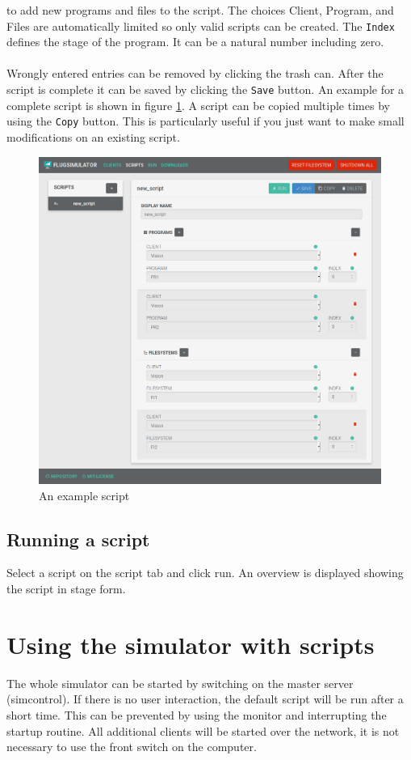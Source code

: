 \documentclass[accentcolor=tud1a, paper=a4, colorback]{tudreport}
\begin{document}
	to add new programs and files to the script. The choices Client, Program, and Files are automatically
	limited so only valid scripts can be created. The \texttt{Index} defines the stage of the
	program. It can be a natural number including zero.
	\\\\
	Wrongly entered entries can be removed by clicking the trash can. After the script is complete
	it can be saved by clicking the \texttt{Save} button. An example for a complete script
	is shown in figure \ref{example_script}. A script can be copied multiple times by using
	the \texttt{Copy} button. This is particularly useful if you just want to make small modifications
	on an existing script.
	\begin{figure}[t]
		\centering
		\includegraphics[width=.9\textwidth]{example_script}
		\caption{An example script}
		\label{example_script}
	\end{figure}

	\section{Running a script}
	Select a script on the script tab and click run. An overview is displayed showing
	the script in stage form.

	\chapter{Using the simulator with scripts}
	The whole simulator can be started by switching on the master server (simcontrol).
	If there is no user interaction, the default script will be run after a short time.
	This can be prevented by using the monitor and interrupting the startup routine.
	All additional clients will be started over the network, it is not necessary to use the
	front switch on the computer.
\end{document}
